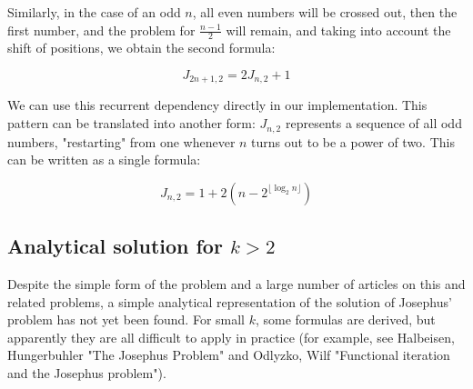 Similarly, in the case of an odd $n$, all even numbers will be crossed out, then the first number, and the problem for $\frac{n-1}{2}$ will remain, and taking into account the shift of positions, we obtain the second formula:

$$J_{2n+1,2} = 2 J_{n, 2} + 1 $$

We can use this recurrent dependency directly in our implementation. This pattern can be translated into another form: $J_{n, 2}$ represents a sequence of all odd numbers, "restarting" from one whenever $n$ turns out to be a power of two. This can be written as a single formula:

$$J_{n, 2} = 1 + 2 \left(n-2^{\lfloor \log_2 n \rfloor} \right)$$

\subsection{Analytical solution for $k > 2$}

Despite the simple form of the problem and a large number of articles on this and related problems, a simple analytical representation of the solution of Josephus' problem has not yet been found. For small $k$, some formulas are derived, but apparently they are all difficult to apply in practice (for example, see Halbeisen, Hungerbuhler "The Josephus Problem" and Odlyzko, Wilf "Functional iteration and the Josephus problem").

